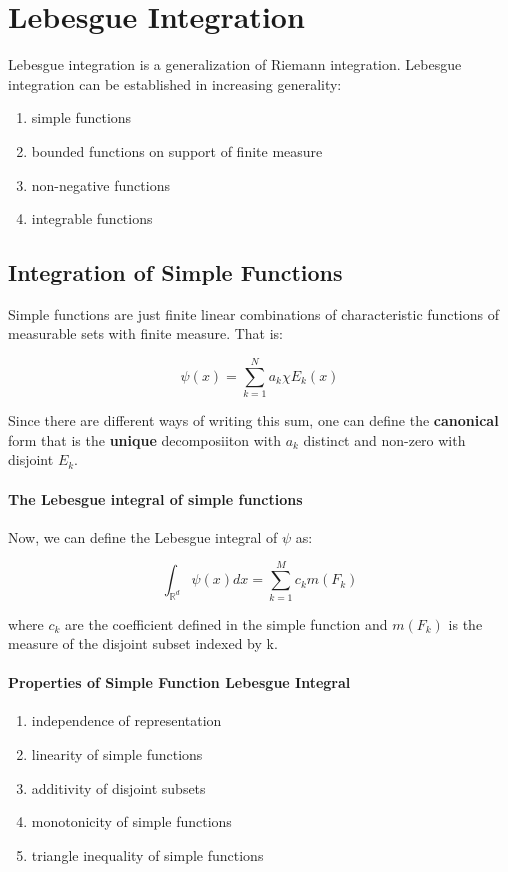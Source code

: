 \documentclass[class=article, crop=false]{standalone}
\begin{document}
\section{Lebesgue Integration}
	Lebesgue integration is a generalization of Riemann integration. Lebesgue integration can be established in increasing generality:

	\begin{enumerate}
		\item simple functions
		\item bounded functions on support of finite measure
		\item non-negative functions
		\item integrable functions
	\end{enumerate}
	\subsection{Integration of Simple Functions}
		Simple functions are just finite linear combinations of characteristic functions of measurable sets with finite measure. That is:

			$$\psi(x) = \sum_{k=1}^N a_k \chi E_k(x)$$

		Since there are different ways of writing this sum, one can define the \textbf{canonical} form that is the \textbf{unique} decomposiiton with $a_k$ distinct and non-zero with disjoint $E_k$.

		\paragraph{The Lebesgue integral of simple functions}

		Now, we can define the Lebesgue integral of $\psi$ as:

			$$\int_{\mathbb{R}^d} \psi(x) dx = \sum_{k=1}^M c_k m(F_k)$$

		where $c_k$ are the coefficient defined in the simple function and $m(F_k)$ is the measure of the disjoint subset indexed by k.

		\paragraph{Properties of Simple Function Lebesgue Integral}

			\begin{enumerate}
				\item independence of representation
				\item linearity of simple functions
				\item additivity of disjoint subsets
				\item monotonicity of simple functions
				\item triangle inequality of simple functions
			\end{enumerate}
\end{document}
